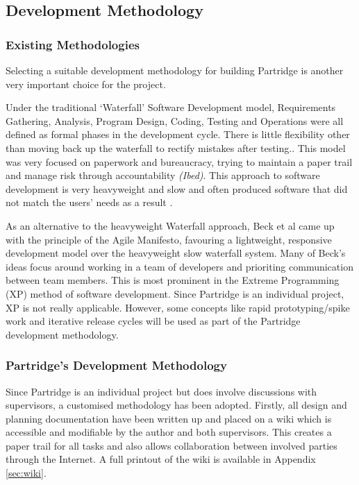 \documentclass[12pt,a4paper]{article}
\begin{document}
\subsection{Development Methodology}

\subsubsection{Existing Methodologies}
Selecting a suitable development methodology for building Partridge is another
very important choice for the project.

Under the traditional `Waterfall' Software Development model, Requirements
Gathering, Analysis, Program Design, Coding, Testing and Operations were all
defined as formal phases in the development cycle. There is little flexibility
other than moving back up the waterfall to rectify mistakes after
testing.\cite{Royce:1987:MDL:41765.41801}. This model was very focused on
paperwork and bureaucracy, trying to maintain a paper trail and manage risk
through accountability \emph{(Ibed)}. This approach to software development is
very heavyweight and slow and often produced software that did not match the
users' needs as a result \cite{Boehm1988}.

As an alternative to the heavyweight Waterfall approach, Beck et al came up
with the principle of the Agile Manifesto, favouring a lightweight, responsive
development model over the heavyweight slow waterfall
system\cite{beck2001agile}. Many of Beck's ideas focus around working in a team
of developers and prioriting communication between team members. This is most
prominent in the Extreme Programming (XP) method of software development. Since
Partridge is an individual project, XP is not really applicable. However, some
concepts like rapid prototyping/spike work and iterative release cycles will be
used as part of the Partridge development methodology.

\subsubsection{ Partridge's Development Methodology}

Since Partridge is an individual project but does involve discussions with
supervisors, a customised methodology has been adopted. Firstly, all design
and planning documentation have been written up and placed on a wiki which is
accessible and modifiable by the author and both supervisors. This creates a
paper trail for all tasks and also allows collaboration between involved
parties through the Internet. A full printout of the wiki is available in
Appendix \ref{sec:wiki}. 
\end{document}
